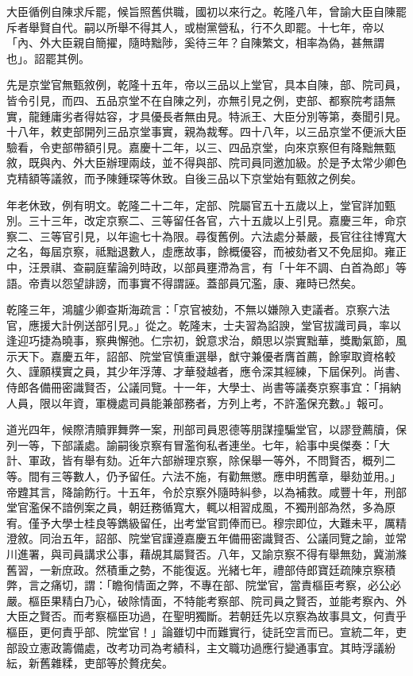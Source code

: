 \begin{pinyinscope}
大臣循例自陳求斥罷，候旨照舊供職，國初以來行之。乾隆八年，曾諭大臣自陳罷斥者舉賢自代。嗣以所舉不得其人，或樹黨營私，行不久即罷。十七年，帝以「內、外大臣親自簡擢，隨時黜陟，奚待三年？自陳繁文，相率為偽，甚無謂也」。詔罷其例。

先是京堂官無甄敘例，乾隆十五年，帝以三品以上堂官，具本自陳，部、院司員，皆令引見，而四、五品京堂不在自陳之列，亦無引見之例，吏部、都察院考語無實，龍鍾庸劣者得姑容，才具優長者無由見。特派王、大臣分別等第，奏聞引見。十八年，敕吏部開列三品京堂事實，親為裁奪。四十八年，以三品京堂不便派大臣驗看，令吏部帶額引見。嘉慶十二年，以三、四品京堂，向來京察但有降黜無甄敘，既與內、外大臣辦理兩歧，並不得與部、院司員同邀加級。於是予太常少卿色克精額等議敘，而予陳鍾琛等休致。自後三品以下京堂始有甄敘之例矣。

年老休致，例有明文。乾隆二十二年，定部、院屬官五十五歲以上，堂官詳加甄別。三十三年，改定京察二、三等留任各官，六十五歲以上引見。嘉慶三年，命京察二、三等官引見，以年逾七十為限。尋復舊例。六法處分綦嚴，長官往往博寬大之名，每屆京察，祗黜退數人，虛應故事，餘概優容，而被劾者又不免屈抑。雍正中，汪景祺、查嗣庭輩論列時政，以部員壅滯為言，有「十年不調、白首為郎」等語。帝責以怨望誹謗，而事實不得謂誣。蓋部員冗濫，康、雍時已然矣。

乾隆三年，鴻臚少卿查斯海疏言：「京官被劾，不無以嫌隙入吏議者。京察六法官，應援大計例送部引見。」從之。乾隆末，士夫習為諂諛，堂官拔識司員，率以逢迎巧捷為曉事，察典懈弛。仁宗初，銳意求治，頗思以崇實黜華，獎勵氣節，風示天下。嘉慶五年，詔部、院堂官慎重選舉，猷守兼優者膺首薦，餘寧取資格較久、謹願樸實之員，其少年浮薄、才華發越者，應令深其經練，下屆保列。尚書、侍郎各備冊密識賢否，公議同覽。十一年，大學士、尚書等議奏京察事宜：「捐納人員，限以年資，軍機處司員能兼部務者，方列上考，不許濫保充數。」報可。

道光四年，候際清贖罪舞弊一案，刑部司員恩德等朋謀撞騙堂官，以謬登薦牘，保列一等，下部議處。諭嗣後京察有冒濫徇私者連坐。七年，給事中吳傑奏：「大計、軍政，皆有舉有劾。近年六部辦理京察，除保舉一等外，不問賢否，概列二等。間有三等數人，仍予留任。六法不施，有勸無懲。應申明舊章，舉劾並用。」帝韙其言，降諭飭行。十五年，令於京察外隨時糾參，以為補救。咸豐十年，刑部堂官濫保不諳例案之員，朝廷務循寬大，輒以相習成風，不獨刑部為然，多為原宥。僅予大學士桂良等鐫級留任，出考堂官罰俸而已。穆宗即位，大難未平，厲精澄敘。同治五年，詔部、院堂官謹遵嘉慶五年備冊密識賢否、公議同覽之諭，並常川進署，與司員講求公事，藉覘其屬賢否。八年，又諭京察不得有舉無劾，冀湔滌舊習，一新庶政。然積重之勢，不能復返。光緒七年，禮部侍郎寶廷疏陳京察積弊，言之痛切，謂：「瞻徇情面之弊，不專在部、院堂官，當責樞臣考察，必公必嚴。樞臣果精白乃心，破除情面，不特能考察部、院司員之賢否，並能考察內、外大臣之賢否。而考察樞臣功過，在聖明獨斷。若朝廷先以京察為故事具文，何責乎樞臣，更何責乎部、院堂官！」論雖切中而難實行，徒託空言而已。宣統二年，吏部設立憲政籌備處，改考功司為考績科，主文職功過應行變通事宜。其時浮議紛紜，新舊雜糅，吏部等於贅疣矣。


\end{pinyinscope}

